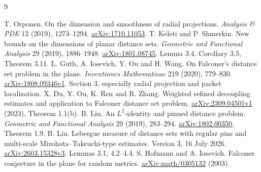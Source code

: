 \documentclass[11pt]{article}
\theoremstyle{definition}\newtheorem{remark}[theorem]{Remark}
\begin{document}
\clearpage
\begin{thebibliography}{9}\small\raggedright
{}
 T. Orponen. On the dimension and smoothness of radial projections. \emph{Analysis \& PDE} 12 (2019), 1273--1294. \href{https://arxiv.org/abs/1710.11053}{arXiv:1710.11053}.
 T. Keleti and P. Shmerkin. New bounds on the dimensions of planar distance sets. \emph{Geometric and Functional Analysis} 29 (2019), 1886--1948. \href{https://arxiv.org/abs/1801.08745}{arXiv:1801.08745}. Lemma 3.4, Corollary 3.5, Theorem 3.11.
 L. Guth, A. Iosevich, Y. Ou and H. Wang. On Falconer's distance set problem in the plane. \emph{Inventiones Mathematicae} 219 (2020), 779--830. \href{https://arxiv.org/pdf/1808.09346v1}{arXiv:1808.09346v1}. Section 3, especially radial projection and packet localization.
 X. Du, Y. Ou, K. Ren and R. Zhang. Weighted refined decoupling estimates and application to Falconer distance set problem. \href{https://arxiv.org/abs/2309.04501}{arXiv:2309.04501v1} (2023), Theorem 1.1(b).
 B. Liu. An \(L^2\)-identity and pinned distance problem. \emph{Geometric and Functional Analysis} 29 (2019), 283--294. \href{https://arxiv.org/abs/1802.00350}{arXiv:1802.00350}, Theorem 1.9.
 B. Liu. Lebesgue measure of distance sets with regular pins and multi-scale Mizohata--Takeuchi-type estimates. Version 3, 16 July 2026. \href{https://arxiv.org/html/2603.15328v3}{arXiv:2603.15328v3}. Lemmas 3.1, 4.2--4.4.
 S. Hofmann and A. Iosevich. Falconer conjecture in the plane for random metrics. \href{https://arxiv.org/abs/math/0305132}{arXiv:math/0305132} (2003).
\end{thebibliography}
\end{document}
